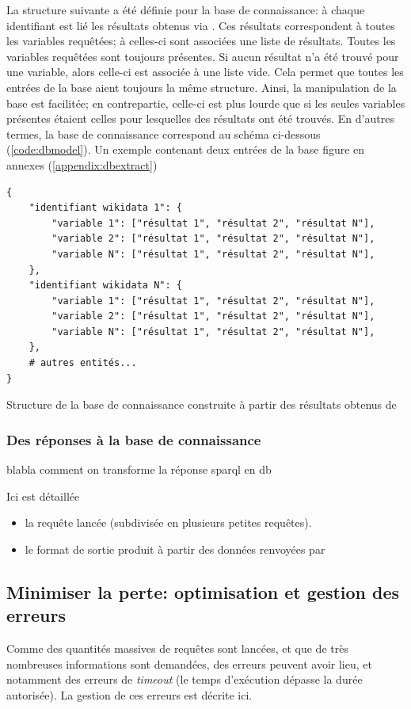 La structure suivante a été définie pour la base de connaissance: à chaque identifiant \wkd{} est lié les résultats obtenus via \sparql{}. Ces résultats correspondent à toutes les variables requêtées; à celles-ci sont associées une liste de résultats. Toutes les variables requêtées sont toujours présentes. Si aucun résultat n'a été trouvé pour une variable, alors celle-ci est associée à une liste vide. Cela permet que toutes les entrées de la base aient toujours la même structure. Ainsi, la manipulation de la base est facilitée; en contrepartie, celle-ci est plus lourde que si les seules variables présentes étaient celles pour lesquelles des résultats ont été trouvés. En d'autres termes, la base de connaissance correspond au schéma ci-dessous (\ref{code:dbmodel}). Un exemple contenant deux entrées de la base figure en annexes (\ref{appendix:dbextract})

\begin{listing}[h]
	\begin{verbatim}
{
	"identifiant wikidata 1": {
		"variable 1": ["résultat 1", "résultat 2", "résultat N"],
		"variable 2": ["résultat 1", "résultat 2", "résultat N"],
		"variable N": ["résultat 1", "résultat 2", "résultat N"],
	},
	"identifiant wikidata N": {
		"variable 1": ["résultat 1", "résultat 2", "résultat N"],
		"variable 2": ["résultat 1", "résultat 2", "résultat N"],
		"variable N": ["résultat 1", "résultat 2", "résultat N"],
	},
	# autres entités...
}
	\end{verbatim}
	\caption{Structure de la base de connaissance construite à partir des résultats obtenus de \sparql{}}
	\label{code:dbmodel}
\end{listing}

\subsubsection{Des réponses \sparql{} à la base de connaissance}
blabla comment on transforme la réponse sparql en db


Ici est détaillée 
\begin{itemize}
	\item la requête \sparql{} lancée (subdivisée en plusieurs petites requêtes).
	\item le format de sortie produit à partir des données renvoyées par \sparql
\end{itemize}

\subsection{Minimiser la perte: optimisation et gestion des erreurs}
Comme des quantités massives de requêtes sont lancées, et que de très nombreuses informations sont demandées, des erreurs peuvent avoir lieu, et notamment des erreurs de \textit{timeout} (le temps d'exécution dépasse la durée autorisée). La gestion de ces erreurs est décrite ici.

